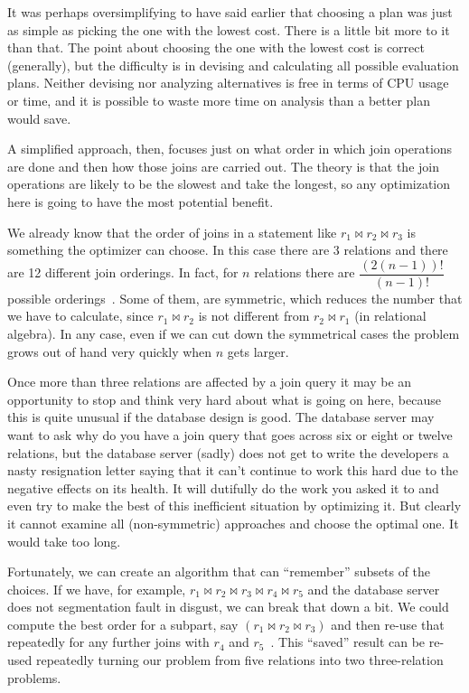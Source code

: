 \documentclass[a4paper]{report}
\begin{document}
It was perhaps oversimplifying to have said earlier that choosing a plan was just as simple as picking the one with the lowest cost. There is a little bit more to it than that. The point about choosing the one with the lowest cost is correct (generally), but the difficulty is in devising and calculating all possible evaluation plans. Neither devising nor analyzing alternatives is free in terms of CPU usage or time, and it is possible to waste more time on analysis than a better plan would save. 

A simplified approach, then, focuses just on what order in which join operations are done and then how those joins are carried out. The theory is that the join operations are likely to be the slowest and take the longest, so any optimization here is going to have the most potential benefit.

We already know that the order of joins in a statement like $r_{1} \bowtie r_{2} \bowtie r_{3}$ is something the optimizer can choose. In this case there are 3 relations and there are 12 different join orderings. In fact, for $n$ relations there are $\dfrac{(2(n-1))!}{(n-1)!}$ possible orderings~\cite{dsc}. Some of them, are symmetric, which reduces the number that we have to calculate, since $r_{1} \bowtie r_{2}$ is not different from $r_{2} \bowtie r_{1}$ (in relational algebra). In any case, even if we can cut down the symmetrical cases the problem grows out of hand very quickly when $n$ gets larger. 

Once more than three relations are affected by a join query it may be an opportunity to stop and think very hard about what is going on here, because this is quite unusual if the database design is good. The database server may want to ask why do you have a join query that goes across six or eight or twelve relations, but the database server (sadly) does not get to write the developers a nasty resignation letter saying that it can't continue to work this hard due to the negative effects on its health. It will dutifully do the work you asked it to and even try to make the best of this inefficient situation by optimizing it. But clearly it cannot examine all (non-symmetric) approaches and choose the optimal one. It would take too long.

Fortunately, we can create an algorithm that can ``remember'' subsets of the choices. If we have, for example, $r_{1} \bowtie r_{2} \bowtie r_{3} \bowtie r_{4} \bowtie r_{5}$ and the database server does not segmentation fault in disgust, we can break that down a bit. We could compute the best order for a subpart, say $(r_{1} \bowtie r_{2} \bowtie r_{3})$ and then re-use that repeatedly for any further joins with $r_{4}$ and $r_{5}$~\cite{dsc}. This ``saved'' result can be re-used repeatedly turning our problem from five relations into two three-relation problems.
\end{document}
